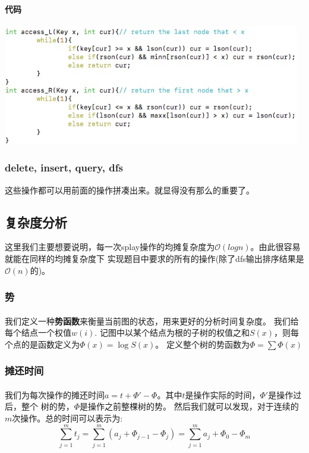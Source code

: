 \documentclass{article}
\begin{document}
		\paragraph{代码}
			\begin{center}
			\includegraphics[width = 13cm]{access_code.jpeg}\\
			\end{center}
	\subsubsection{delete, insert, query, dfs}
		这些操作都可以用前面的操作拼凑出来。就显得没有那么的重要了。
\subsection{复杂度分析}
	这里我们主要想要说明，每一次splay操作的均摊复杂度为$\mathcal{O}(logn)$。由此很容易就能在同样的均摊复杂度下
	实现题目中要求的所有的操作(除了dfs输出排序结果是$\mathcal{O}(n)$的)。
	\subsubsection{势}
		\paragraph{}
			我们定义一种\textbf{势函数}来衡量当前图的状态，用来更好的分析时间复杂度。
			我们给每个结点一个权值$w(i)$.
			记图中以某个结点为根的子树的权值之和$S(x)$，则每个点的是函数定义为$\Phi (x) = \log S(x)$。
			定义整个树的势函数为$\Phi = \sum \Phi(x)$
	\subsubsection{摊还时间}
		\paragraph{}
			我们为每次操作的摊还时间$a = t + \Phi' - \Phi$。其中$t$是操作实际的时间，$\Phi'$是操作过后，整个
			树的势，$\Phi$是操作之前整棵树的势。
			然后我们就可以发现，对于连续的$m$次操作。总的时间可以表示为:
			\begin{displaymath}
				\sum_{j=1}^m t_j = \sum_{j=1}^m (a_j + \Phi_{j-1} - \Phi_j) = \sum_{j=1}^m a_j + \Phi_0 - \Phi_m
			\end{displaymath}
\end{document}

